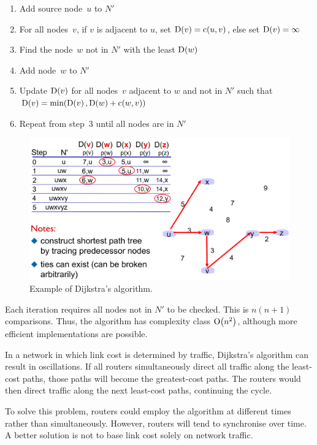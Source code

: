 \begin{enumerate}
  \item Add source node~\(u\) to \(N'\)
  \item For all nodes~\(v\), if \(v\) is adjacent to \(u\), set \(\textup{D}\!\left( v \right) = \textup{c}\!\left( u, v \right)\), else set \(\textup{D}\!\left( v \right) = \infty\)
  \item Find the node~\(w\) not in \(N'\) with the least \(\textup{D}\!\left( w \right)\)
  \item Add node~\(w\) to \(N'\)
  \item Update \(\textup{D}\!\left( v \right)\) for all nodes~\(v\) adjacent to \(w\) and not in \(N'\) such that \(\textup{D}\!\left( v \right) = \textup{min}\!\left( \textup{D}\!\left( v \right), \textup{D}\!\left( w \right) + \textup{c}\!\left( w, v \right) \right)\)
  \item Repeat from step~\num{3} until all nodes are in \(N'\)
\end{enumerate}

\begin{figure}[htp]
  \centering
  \includegraphics[width=15cm]{unit-19/figures/dijkstras-algorithm.png}
  \caption*{Example of Dijkstra's algorithm.}
\end{figure}

Each iteration requires all nodes not in \(N'\) to be checked.
This is \(n \left(n + 1\right)\) comparisons.
Thus, the algorithm has complexity class \(\textup{O}\!\left( n^2 \right)\), although more efficient implementations are possible.

In a network in which link cost is determined by traffic, Dijkstra's algorithm can result in oscillations.
If all routers simultaneously direct all traffic along the least-cost paths, those paths will become the greatest-cost paths.
The routers would then direct traffic along the next least-cost paths, continuing the cycle.

To solve this problem, routers could employ the algorithm at different times rather than simultaneously.
However, routers will tend to synchronise over time.
A better solution is not to base link cost solely on network traffic.

